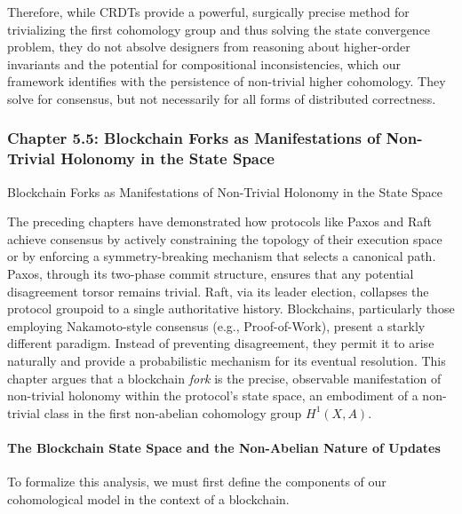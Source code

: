 \documentclass[
]{article}
\begin{document}
Therefore, while CRDTs provide a powerful, surgically precise method for
trivializing the first cohomology group and thus solving the state
convergence problem, they do not absolve designers from reasoning about
higher-order invariants and the potential for compositional
inconsistencies, which our framework identifies with the persistence of
non-trivial higher cohomology. They solve for consensus, but not
necessarily for all forms of distributed correctness.

\subsubsection{Chapter 5.5: Blockchain Forks as Manifestations of
Non-Trivial Holonomy in the State
Space}\label{chapter-5.5-blockchain-forks-as-manifestations-of-non-trivial-holonomy-in-the-state-space}

\protect{}\label{chapter-5-5-Blockchain_Forks_as_Manifestations_of_No}{}

Blockchain Forks as Manifestations of Non-Trivial Holonomy in the State
Space

The preceding chapters have demonstrated how protocols like Paxos and
Raft achieve consensus by actively constraining the topology of their
execution space or by enforcing a symmetry-breaking mechanism that
selects a canonical path. Paxos, through its two-phase commit structure,
ensures that any potential disagreement torsor remains trivial. Raft,
via its leader election, collapses the protocol groupoid to a single
authoritative history. Blockchains, particularly those employing
Nakamoto-style consensus (e.g., Proof-of-Work), present a starkly
different paradigm. Instead of preventing disagreement, they permit it
to arise naturally and provide a probabilistic mechanism for its
eventual resolution. This chapter argues that a blockchain \emph{fork}
is the precise, observable manifestation of non-trivial holonomy within
the protocol's state space, an embodiment of a non-trivial class in the
first non-abelian cohomology group \(H^1(X, A)\).

\paragraph{The Blockchain State Space and the Non-Abelian Nature of
Updates}\label{the-blockchain-state-space-and-the-non-abelian-nature-of-updates}

To formalize this analysis, we must first define the components of our
cohomological model in the context of a blockchain.
\end{document}
